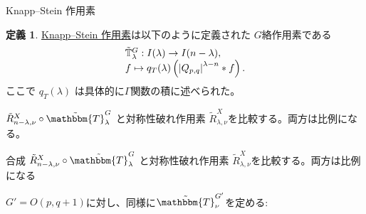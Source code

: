 \documentclass[notheorems]{beamer}
\theoremstyle{definition}
\newtheorem{definition}{{定義}}
\theoremstyle{example}
\theoremstyle{remark}
\theoremstyle{mystyle}
\begin{document}
\begin{frame}{Knapp--Stein 作用素}
	\begin{definition}
		\underline{Knapp--Stein 作用素}は以下のように定義された $G$絡作用素である\begin{equation*}
			\begin{array}[]{l}
				\tilde{\mathbb{T}}_\lambda^G:I(\lambda)\to I(n-\lambda),\\
				f\mapsto q_T(\lambda)\left(\myabs{Q_{p,q}}^{\lambda-n}\ast f  \right).
			\end{array}
		\end{equation*}
		ここで
		$q_T (\lambda)$ は具体的に$\Gamma$関数の積に述べられた。
	\end{definition}
		$\tilde{R}_{n - \lambda, \nu}^X \circ\tilde{\mathbbm{T}}_{\lambda}^G$ と対称性破れ作用素 $\tilde{R}_{\lambda, \nu}^X$を比較する。両方は比例になる。　
\end{frame}
\begin{frame}{}
	合成
		$\tilde{R}_{n - \lambda, \nu}^X \circ\tilde{\mathbbm{T}}_{\lambda}^G$ と対称性破れ作用素 $\tilde{R}_{\lambda, \nu}^X$を比較する。両方は比例になる
		\centerline{}
		$G' = O (p, q + 1)$に対し、同様に$\tilde{\mathbbm{T}}_{\nu}^{G'}$を定める:
		\centerline{
			}
\end{frame}
\end{document}
